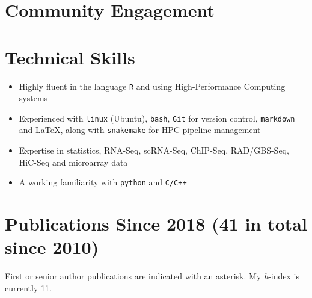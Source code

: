 \documentclass[11pt,a4paper,]{moderncv}
\providecommand{\tightlist}{%
	\setlength{\itemsep}{0pt}\setlength{\parskip}{0pt}}
\begin{document}
\hypertarget{community-engagement}{%
\section{Community Engagement}\label{community-engagement}}

\nopagebreak

\hypertarget{technical-skills}{%
\section{Technical Skills}\label{technical-skills}}

\begin{itemize}
\tightlist
\item
  Highly fluent in the language \texttt{R} and using High-Performance
  Computing systems
\item
  Experienced with \texttt{linux} (Ubuntu), \texttt{bash}, \texttt{Git}
  for version control, \texttt{markdown} and \LaTeX, along with
  \texttt{snakemake} for HPC pipeline management
\item
  Expertise in statistics, RNA-Seq, scRNA-Seq, ChIP-Seq, RAD/GBS-Seq,
  HiC-Seq and microarray data
\item
  A working familiarity with \texttt{python} and \texttt{C/C++}
\end{itemize}

\hypertarget{publications-since-2018-41-in-total-since-2010}{%
\section{Publications Since 2018 (41 in total since
2010)}\label{publications-since-2018-41-in-total-since-2010}}

First or senior author publications are indicated with an asterisk. My
\emph{h}-index is currently 11.

\vspace{4mm}
\end{document}
